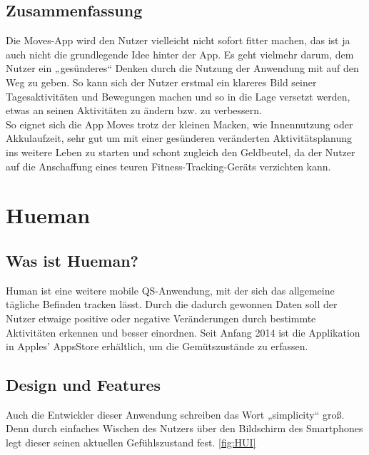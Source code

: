 \subsection{Zusammenfassung}
\label{ch:Apps:sec:Moves:subsec:VERDICT} 

Die Moves-App wird den Nutzer vielleicht nicht sofort fitter machen, das ist ja auch nicht die grundlegende Idee hinter der App. 
Es geht vielmehr darum, dem Nutzer ein „gesünderes“ Denken durch die Nutzung der Anwendung mit auf den Weg zu geben. 
So kann sich der Nutzer erstmal ein klareres Bild seiner Tagesaktivitäten und Bewegungen machen und so in die Lage versetzt werden, etwas an seinen Aktivitäten zu ändern bzw. zu verbessern.
\\
So eignet sich die App Moves trotz der kleinen Macken, wie Innennutzung oder Akkulaufzeit, sehr gut um mit einer gesünderen veränderten Aktivitätsplanung ins weitere Leben zu starten und schont zugleich den Geldbeutel, da der Nutzer auf die Anschaffung eines teuren Fitness-Tracking-Geräts verzichten kann.

\section{Hueman}
\label{ch:Apps:sec:Hueman}

\subsection{Was ist Hueman?}
\label{ch:Apps:sec:Hueman:subsec:WIH}

Human ist eine weitere mobile QS-Anwendung, mit der sich das allgemeine tägliche Befinden tracken lässt. 
Durch die dadurch gewonnen Daten soll der Nutzer etwaige positive oder negative Veränderungen durch bestimmte Aktivitäten erkennen und besser einordnen.
Seit Anfang 2014 ist die Applikation in Apples' AppsStore erhältlich, um die Gemütszustände zu erfassen.


\subsection{Design und Features}
\label{ch:Apps:sec:Hueman:subsec:DuFe}

Auch die Entwickler dieser Anwendung schreiben das Wort „simplicity“ groß. 
Denn durch einfaches Wischen des Nutzers über den Bildschirm des Smartphones legt dieser seinen aktuellen Gefühlszustand fest.
\ref{fig:HUI}

